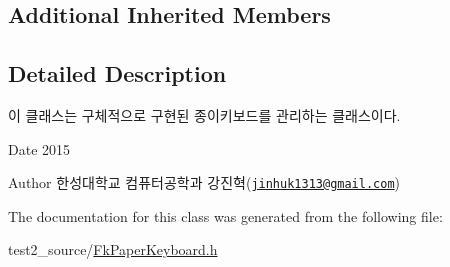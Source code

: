 \subsection*{Additional Inherited Members}


\subsection{Detailed Description}
이 클래스는 구체적으로 구현된 종이키보드를 관리하는 클래스이다. 

\begin{DoxyDate}{Date}
2015 
\end{DoxyDate}
\begin{DoxyAuthor}{Author}
한성대학교 컴퓨터공학과 강진혁(\href{mailto:jinhuk1313@gmail.com}{\tt jinhuk1313@gmail.\+com}) 
\end{DoxyAuthor}


The documentation for this class was generated from the following file\+:\begin{DoxyCompactItemize}
\item 
test2\+\_\+source/\hyperlink{_fk_paper_keyboard_8h}{Fk\+Paper\+Keyboard.\+h}\end{DoxyCompactItemize}
